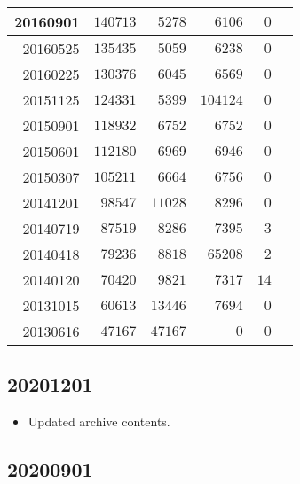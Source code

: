 \documentclass[hidelinks,a4paper,12pt]{article}
\begin{document}
\begin{center}
\begin{tabular}{|r|r|r|r|r|r|}
20160901         & $140713$         & $5278$         & $6106$           & $0$              \\ \hline
20160525         & $135435$         & $5059$         & $6238$           & $0$              \\ \hline
20160225         & $130376$         & $6045$         & $6569$           & $0$              \\ \hline
20151125         & $124331$         & $5399$         & $104124$         & $0$              \\ \hline
20150901         & $118932$         & $6752$         & $6752$           & $0$              \\ \hline
20150601         & $112180$         & $6969$         & $6946$           & $0$              \\ \hline
20150307         & $105211$         & $6664$         & $6756$           & $0$              \\ \hline
20141201         & $98547$          & $11028$        & $8296$           & $0$              \\ \hline
20140719         & $87519$          & $8286$         & $7395$           & $3$              \\ \hline
20140418         & $79236$          & $8818$         & $65208$          & $2$              \\ \hline
20140120         & $70420$          & $9821$         & $7317$           & $14$             \\ \hline
20131015         & $60613$          & $13446$        & $7694$           & $0$              \\ \hline
20130616         & $47167$          & $47167$        & $0$              & $0$              \\ \hline
\end{tabular}
\end{center}

\subsection{20201201}  \label{sec:changelog_20201201}

\begin{itemize}
\item Updated archive contents.
\end{itemize}

\subsection{20200901}  \label{sec:changelog_20200901}
\end{document}
